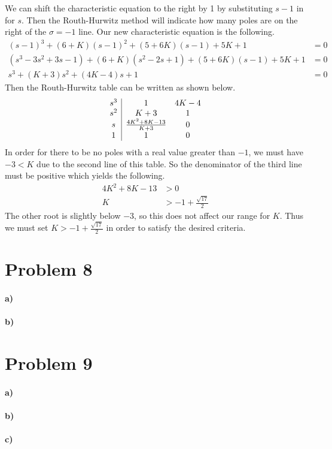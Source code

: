 \documentclass[12pt]{article}
\begin{document}
We can shift the characteristic equation to the right by 1 by substituting \(s-1\) in for \(s\). Then the Routh-Hurwitz method
will indicate how many poles are on the right of the \(\sigma=-1\) line. Our new characteristic equation is the following.
\begin{align*}
    (s-1)^3+(6+K)(s-1)^2+(5+6K)(s-1)+5K+1&=0\\
    (s^3-3s^2+3s-1)+(6+K)(s^2-2s+1)+(5+6K)(s-1)+5K+1&=0\\
    s^3 +(K+3)s^2 + (4K-4)s +1 &=0
\end{align*}
Then the Routh-Hurwitz table can be written as shown below.
\[\begin{array}{c|c c}
    s^3 & 1 & 4K-4\\
    s^2 & K+3 & 1\\
    s & \frac{4K^2+8K-13}{K+3} & 0\\
    1 & 1 & 0
\end{array}\]
In order for there to be no poles with a real value greater than \(-1\), we must have \(-3<K\) due to the second line of this table.
So the denominator of the third line must be positive which yields the following.
\begin{align*}
    4K^2+8K-13&>0\\
    K&>-1+\frac{\sqrt{17}}{2}
\end{align*}
The other root is slightly below \(-3\), so this does not affect our range for \(K\). Thus we must set \(K>-1+\frac{\sqrt{17}}{2}\)
in order to satisfy the desired criteria.

\section*{Problem 8}

\paragraph{a)}

\paragraph{b)}

\section*{Problem 9}

\paragraph{a)}

\paragraph{b)}

\paragraph{c)}
\end{document}
